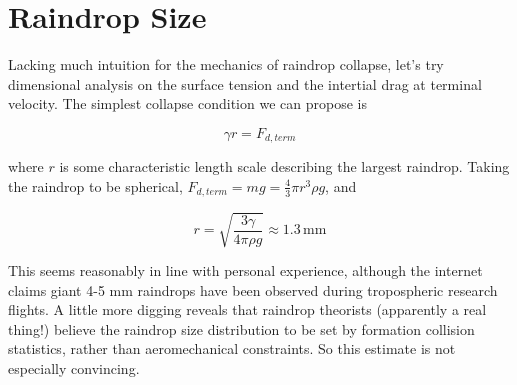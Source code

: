 \documentclass[12pt]{article}
\begin{document}




\section{Raindrop Size}

Lacking much intuition for the mechanics of raindrop collapse, let's try dimensional analysis on the surface tension and the intertial drag at terminal velocity. The simplest collapse condition we can propose is 

\[ \gamma r = F_{d,term}
\]

where \(r\) is some characteristic length scale describing the largest raindrop. Taking the raindrop to be spherical, \(F_{d,term} = mg = \frac{4}{3}\pi r^3 \rho g\), and

\[ r = \sqrt{\frac{3\gamma}{4\pi\rho g}} \approx 1.3 \, \mathrm{mm}
\]

This seems reasonably in line with personal experience, although the internet claims giant 4-5 mm raindrops have been observed during tropospheric research flights. A little more digging reveals that raindrop theorists (apparently a real thing!) believe the raindrop size distribution to be set by formation collision statistics, rather than aeromechanical constraints. So this estimate is not especially convincing. 
\end{document}
